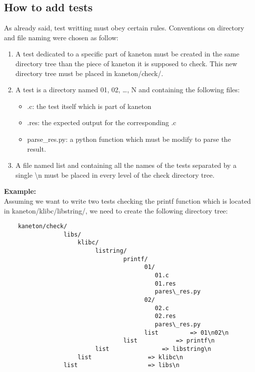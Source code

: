 {\subsection{How to add tests}
As already said, test writting must obey certain rules. Conventions on
directory and file naming were chosen as follow:
\begin{enumerate}
\item A test dedicated to a specific part of kaneton must be created in the same
directory tree than the piece of kaneton it is supposed to check. This new
directory tree must be placed in kaneton/check/.
\item A test is a directory named 01, 02, \ldots, N and containing the following
files:
\begin{itemize}
\item .c: the test itself which is part of kaneton
\item .res: the expected output for the corresponding .c
\item parse\_res.py: a python function which must be modify to parse the
result.
\end{itemize}
\item A file named list and containing all the names of the tests separated by a
single \textbackslash n must be placed in every level of the check directory
tree.
\\
\end{enumerate}
{\bf Example:}\\
Assuming we want to write two tests checking the printf function
which is located in kaneton/klibc/libstring/, we need to create the following
 directory tree:

\begin{verbatim}
    kaneton/check/
                 libs/
                     klibc/
                          listring/
                                  printf/
                                        01/
                                           01.c
                                           01.res
                                           pares\_res.py
                                        02/
                                           02.c
                                           02.res
                                           pares\_res.py
                                        list		 => 01\n02\n
                                  list			 => printf\n
                          list				 => libstring\n
                     list				 => klibc\n
                 list					 => libs\n


\end{verbatim}}
